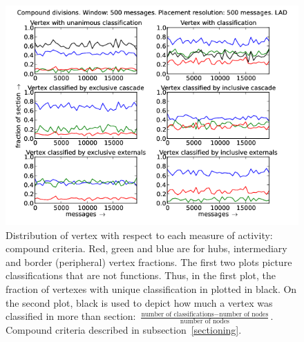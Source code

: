 \documentclass[%
 aip,
 jmp,%
 amsmath,amssymb,
 reprint,%
]{revtex4-1}
\begin{document}
\begin{figure}[hbtp] 
   \centering
        \includegraphics[width=\textwidth]{figs/LAD/500_2}
    \caption{Distribution of vertex with respect to each measure of activity: compound criteria. Red, green and blue are for hubs, intermediary and border (peripheral) vertex fractions. The first two plots picture classifications that are not functions. Thus, in the first plot, the fraction of vertexes with unique classification in plotted in black. On the second plot, black is used to depict how much a vertex was classified in more than section: $\frac{\text{number of classifications} - \text{number of nodes}}{\text{number of nodes}}$. Compound criteria described in subsection~\ref{sectioning}.}
    \label{fig:lad500_}
\end{figure}
\end{document}
